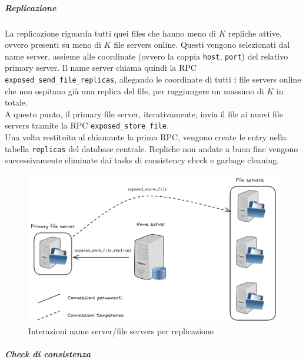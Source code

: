 \documentclass[a4paper, 12pt]{scrreprt}
\begin{document}
            \subparagraph{Replicazione}

                La replicazione riguarda tutti quei files che hanno meno di $K$ repliche attive, ovvero presenti su meno di $K$ file servers online. Questi vengono selezionati dal name server, assieme alle coordinate (ovvero la coppia \texttt{host}, \texttt{port}) del relativo primary server. Il name server chiama quindi la RPC \texttt{exposed\_send\_file\_replicas}, allegando le coordinate di tutti i file servers online che non ospitano già una replica del file, per raggiungere un massimo di $K$ in totale.\\
                A questo punto, il primary file server, iterativamente, invia il file ai nuovi file servers tramite la RPC \texttt{exposed\_store\_file}.\\
                Una volta restituita al chiamante la prima RPC, vengono create le entry nella tabella \texttt{replicas} del database centrale. Repliche non andate a buon fine vengono successivamente eliminate dai tasks di consistency check e garbage cleaning.

                \begin{figure}[H]
                    \centering
                    \includegraphics[width = .6 \textwidth]{img/replica.png}
                    \caption{Interazioni name server/file servers per replicazione}
                \end{figure}

            \subparagraph{Check di consistenza}
\end{document}
